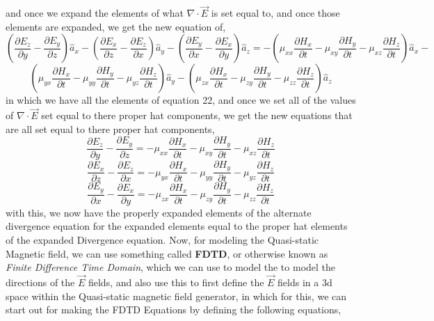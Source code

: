 \documentclass[]{article}
\begin{document}
and once we expand the elements of what $\nabla \cdot \vec{E}$ is set equal to, and once those elements are expanded, we get the new equation of,
\[(\frac{\partial{E}_z}{\partial{y}} - \frac{\partial{E}_y}{\partial{z}})\hat{a}_x - (\frac{\partial{E}_x}{\partial{z}} - \frac{\partial{E}_z}{\partial{x}})\hat{a}_y - (\frac{\partial{E}_y}{\partial{x}} - \frac{\partial{E}_x}{\partial{y}})\hat{a}_z = 
-(\mu_{xx}\frac{\partial{H}_x}{\partial{t}} - \mu_{xy}\frac{\partial{H}_y}{\partial{t}} - \mu_{xz}\frac{\partial{H}_z}{\partial{t}})\hat{a}_x -\]
\[(\mu_{yx}\frac{\partial{H}_x}{\partial{t}} - \mu_{yy}\frac{\partial{H}_y}{\partial{t}} - \mu_{yz}\frac{\partial{H}_z}{\partial{t}})\hat{a}_y - (\mu_{zx}\frac{\partial{H}_x}{\partial{t}} - \mu_{zy}\frac{\partial{H}_y}{\partial{t}} - \mu_{zz}\frac{\partial{H}_z}{\partial{t}})\hat{a}_z\]
in which we have all the elements of equation 22, and once we set all of the values of $\nabla \cdot \vec{E}$ set equal to there proper hat components, we get the new equations that are all set equal to there proper hat components,
\begin{equation}
\frac{\partial{E}_z}{\partial{y}} - \frac{\partial{E}_y}{\partial{z}} = -\mu_{xx}\frac{\partial{H}_x}{\partial{t}} - \mu_{xy}\frac{\partial{H}_y}{\partial{t}} - \mu_{xz}\frac{\partial{H}_z}{\partial{t}} 
\end{equation}
\begin{equation}
\frac{\partial{E}_x}{\partial{z}} - \frac{\partial{E}_z}{\partial{x}} = -\mu_{yx}\frac{\partial{H}_x}{\partial{t}} - \mu_{yy}\frac{\partial{H}_y}{\partial{t}} - \mu_{yz}\frac{\partial{H}_z}{\partial{t}}
\end{equation}
\begin{equation}
\frac{\partial{E}_y}{\partial{x}} - \frac{\partial{E}_x}{\partial{y}} = -\mu_{zx}\frac{\partial{H}_x}{\partial{t}} - \mu_{zy}\frac{\partial{H}_y}{\partial{t}} - \mu_{zz}\frac{\partial{H}_z}{\partial{t}}
\end{equation}
with this, we now have the properly expanded elements of the alternate divergence equation for the expanded elements equal to the proper hat elements of the expanded Divergence equation. Now, for modeling the Quasi-static Magnetic field, we can use something called \textbf{FDTD}, or otherwise known as \textit{Finite Difference Time Domain}, which we can use to model the to model the directions of the $\vec{E}$ fields, and also use this to first define the $\vec{E}$ fields in a 3d space within the Quasi-static magnetic field generator, in which for this, we can start out for making the FDTD Equations by defining the following equations,
\end{document}
